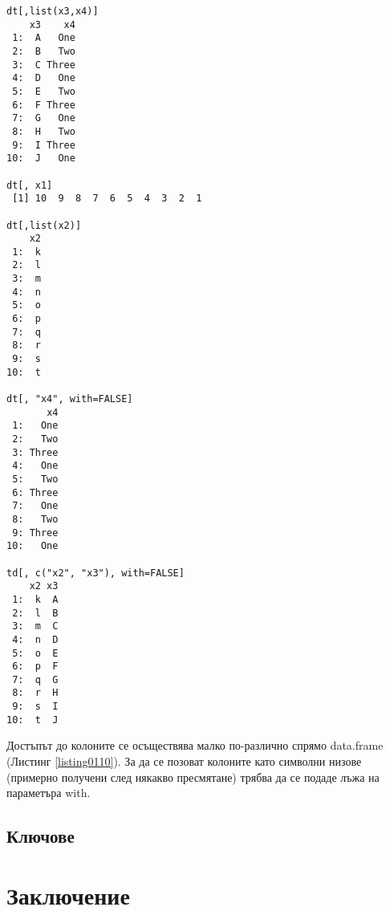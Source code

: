 \begin{lstlisting}[caption=Достъп до колоните, label=listing0110]
dt[,list(x3,x4)]
    x3    x4
 1:  A   One
 2:  B   Two
 3:  C Three
 4:  D   One
 5:  E   Two
 6:  F Three
 7:  G   One
 8:  H   Two
 9:  I Three
10:  J   One

dt[, x1]
 [1] 10  9  8  7  6  5  4  3  2  1

dt[,list(x2)]
    x2
 1:  k
 2:  l
 3:  m
 4:  n
 5:  o
 6:  p
 7:  q
 8:  r
 9:  s
10:  t

dt[, "x4", with=FALSE]
       x4
 1:   One
 2:   Two
 3: Three
 4:   One
 5:   Two
 6: Three
 7:   One
 8:   Two
 9: Three
10:   One

td[, c("x2", "x3"), with=FALSE]
    x2 x3
 1:  k  A
 2:  l  B
 3:  m  C
 4:  n  D
 5:  o  E
 6:  p  F
 7:  q  G
 8:  r  H
 9:  s  I
10:  t  J
\end{lstlisting}

Достъпът до колоните се осъществява малко по-различно спрямо data.frame (Листинг \ref{listing0110}). За да се позоват колоните като символни низове (примерно получени след някакво пресмятане) трябва да се подаде лъжа на параметъра with. 

\subsection{Ключове}



\section*{Заключение}
